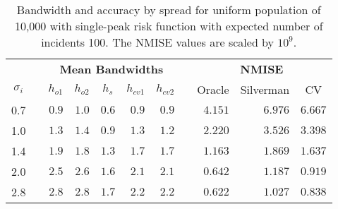 \begin{table}[htbp]
\begin{center}
\begin{tabular}{lcrrrrrcrrr}
\hline\hline
\multicolumn{1}{c}{\bfseries }&\multicolumn{1}{c}{\bfseries }&\multicolumn{5}{c}{\bfseries Mean Bandwidths}&\multicolumn{1}{c}{\bfseries }&\multicolumn{3}{c}{\bfseries NMISE}\tabularnewline
\cline{3-7} \cline{9-11}
\multicolumn{1}{c}{$\sigma_i$}&\multicolumn{1}{c}{}&\multicolumn{1}{c}{$h_{o1}$}&\multicolumn{1}{c}{$h_{o2}$}&\multicolumn{1}{c}{$h_{s}$}&\multicolumn{1}{c}{$h_{cv1}$}&\multicolumn{1}{c}{$h_{cv2}$}&\multicolumn{1}{c}{}&\multicolumn{1}{c}{Oracle}&\multicolumn{1}{c}{Silverman}&\multicolumn{1}{c}{CV}\tabularnewline
\hline
0.7&&$0.9$&$1.0$&$0.6$&$0.9$&$0.9$&&$4.151$&$6.976$&$6.667$\tabularnewline
1.0&&$1.3$&$1.4$&$0.9$&$1.3$&$1.2$&&$2.220$&$3.526$&$3.398$\tabularnewline
1.4&&$1.9$&$1.8$&$1.3$&$1.7$&$1.7$&&$1.163$&$1.869$&$1.637$\tabularnewline
2.0&&$2.5$&$2.6$&$1.6$&$2.1$&$2.1$&&$0.642$&$1.187$&$0.919$\tabularnewline
2.8&&$2.8$&$2.8$&$1.7$&$2.2$&$2.2$&&$0.622$&$1.027$&$0.838$\tabularnewline
\hline
\end{tabular}
\caption[Bandwidth and accuracy by spread of incidents]{Bandwidth and accuracy by spread for uniform population of 10,000 with single-peak risk function with expected number of incidents 100. The NMISE values are scaled by $10^9$.\label{tab:results:bandwidth_vs_spread}}\end{center}
\end{table}
